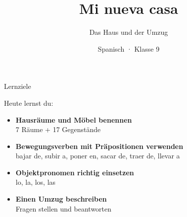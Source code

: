 \documentclass[aspectratio=169, 11pt]{beamer}
\title{Mi nueva casa}
\subtitle{Das Haus und der Umzug}
\author{Spanisch · Klasse 9}
\date{}
\begin{document}
\begin{frame}[plain]
    \titlepage
\end{frame}

\begin{frame}{Lernziele}
    \vspace{0.5cm}

    {\large Heute lernst du:}

    \vspace{0.6cm}

    \begin{itemize}
        \setlength{\itemsep}{0.5cm}
        \item \textbf{Hausräume und Möbel benennen}\\
              {\small 7 Räume + 17 Gegenstände}
        \item \textbf{Bewegungsverben mit Präpositionen verwenden}\\
              {\small bajar de, subir a, poner en, sacar de, traer de, llevar a}
        \item \textbf{Objektpronomen richtig einsetzen}\\
              {\small lo, la, los, las}
        \item \textbf{Einen Umzug beschreiben}\\
              {\small Fragen stellen und beantworten}
    \end{itemize}
\end{frame}

\end{document}
